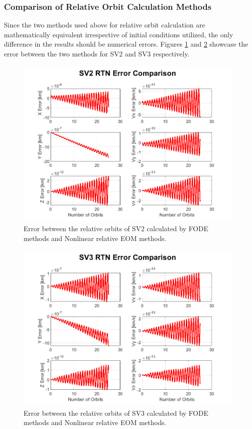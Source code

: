 \subsubsection{Comparison of Relative Orbit Calculation Methods}
Since the two methods used above for relative orbit calculation are mathematically equivalent irrespective of initial conditions utilized, the only difference in the results should be numerical errors. Figures \ref{fig:error_in_SV2_rel} and \ref{fig:error_in_SV3_rel} showcase the error between the two methods for SV2 and SV3 respectively.

\begin{figure}[H]
    \centering
    \includegraphics[width=0.7\linewidth]{sim/figures/SV2_error_in_rel_methods.png}
    \caption{Error between the relative orbits of SV2 calculated by FODE methods and Nonlinear relative EOM methods.}
    \label{fig:error_in_SV2_rel}
\end{figure}

\begin{figure}[H]
    \centering
    \includegraphics[width=0.7\linewidth]{sim/figures/SV3_error_in_rel_methods.png}
    \caption{Error between the relative orbits of SV3 calculated by FODE methods and Nonlinear relative EOM methods.}
    \label{fig:error_in_SV3_rel}
\end{figure}

